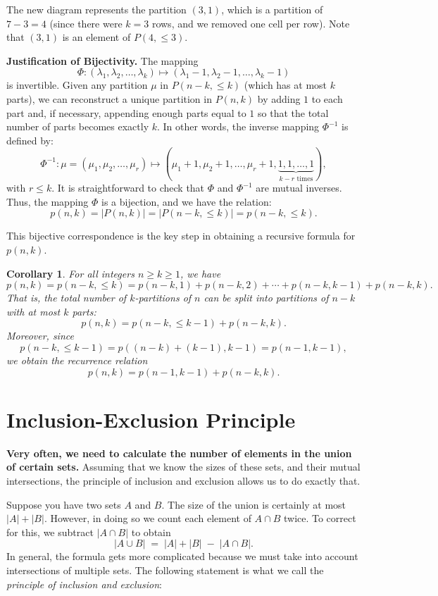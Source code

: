 \documentclass{article}
\newtheorem{corollary}{Corollary}
\begin{document}
The new diagram represents the partition \((3,1)\), which is a partition of \(7-3=4\) (since there were \(k=3\) rows, and we removed one cell per row). Note that \((3,1)\) is an element of \(P(4,\le 3)\).

\medskip

\textbf{Justification of Bijectivity.}  
The mapping
\[
\Phi\colon (\lambda_1,\lambda_2,\dots,\lambda_k) \mapsto (\lambda_1-1,\lambda_2-1,\dots,\lambda_k-1)
\]
is invertible. Given any partition \(\mu\) in \(P(n-k,\le k)\) (which has at most \(k\) parts), we can reconstruct a unique partition in \(P(n,k)\) by adding \(1\) to each part and, if necessary, appending enough parts equal to \(1\) so that the total number of parts becomes exactly \(k\). In other words, the inverse mapping \(\Phi^{-1}\) is defined by:
\[
\Phi^{-1}\colon \mu = (\mu_1,\mu_2,\dots,\mu_r) \mapsto (\mu_1+1,\mu_2+1,\dots,\mu_r+1,\underbrace{1,1,\dots,1}_{k-r \text{ times}}),
\]
with \(r\le k\). It is straightforward to check that \(\Phi\) and \(\Phi^{-1}\) are mutual inverses. Thus, the mapping \(\Phi\) is a bijection, and we have the relation:
\[
p(n,k)=|P(n,k)| = |P(n-k,\le k)| = p(n-k,\le k).
\]

\medskip

This bijective correspondence is the key step in obtaining a recursive formula for \(p(n,k)\).

\begin{corollary}
For all integers \(n\ge k\ge 1\), we have
\[
p(n,k) = p(n-k,\le k)
      = p(n-k,1) + p(n-k,2) + \cdots + p(n-k,k-1) + p(n-k,k).
\]
That is, the total number of \(k\)-partitions of \(n\) can be split into partitions of \(n-k\) with at most \(k\) parts:
\[
p(n,k) = p(n-k,\le k-1) + p(n-k,k).
\]
Moreover, since
\[
p(n-k,\le k-1)=p((n-k)+(k-1),k-1)=p(n-1,k-1),
\]
we obtain the recurrence relation
\[
p(n,k)=p(n-1,k-1)+p(n-k,k).
\]
\end{corollary}




\section{Inclusion-Exclusion Principle}
\noindent
\textbf{Very often, we need to calculate the number of elements in the union of certain sets.}
Assuming that we know the sizes of these sets, and their mutual intersections, the principle of
inclusion and exclusion allows us to do exactly that.

\medskip

Suppose you have two sets \(A\) and \(B\). The size of the union is certainly at most \(\lvert A\rvert + \lvert B\rvert\). However, in doing so we count each element of \(A \cap B\) twice. To correct for this, we subtract \(\lvert A \cap B\rvert\) to obtain
\[
|A \cup B| \;=\; |A| + |B| \;-\; |A \cap B|.
\]
In general, the formula gets more complicated because we must take into account intersections of multiple sets. The following statement is what we call the \emph{principle of inclusion and exclusion}:
\end{document}
